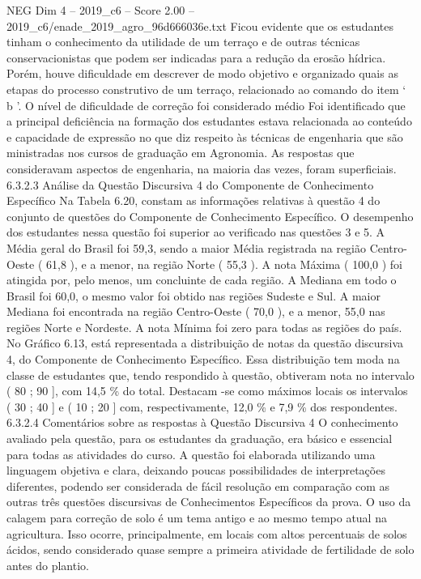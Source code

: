 \begin{textsample}{NEG Dim 4 – 2019\_c6 – Score 2.00 – 2019\_c6/enade\_2019\_agro\_96d666036e.txt}
Ficou evidente que os estudantes tinham o conhecimento da utilidade de um terraço e de outras técnicas conservacionistas que podem ser indicadas para a redução da erosão hídrica.
Porém, houve dificuldade em descrever de modo objetivo e organizado quais as etapas do processo construtivo de um terraço, relacionado ao comando do item ‘ b ’.
O nível de dificuldade de correção foi considerado médio Foi identificado que a principal deficiência na formação dos estudantes estava relacionada ao conteúdo e capacidade de expressão no que diz respeito às técnicas de engenharia que são ministradas nos cursos de graduação em Agronomia.
As respostas que consideravam aspectos de engenharia, na maioria das vezes, foram superficiais. 6.3.2.3 Análise da Questão Discursiva 4 do Componente de Conhecimento Específico Na Tabela 6.20, constam as informações relativas à questão 4 do conjunto de questões do Componente de Conhecimento Específico.
O desempenho dos estudantes nessa questão foi superior ao verificado nas questões 3 e 5.
A Média geral do Brasil foi 59,3, sendo a maior Média registrada na região Centro-Oeste ( 61,8 ), e a menor, na região Norte ( 55,3 ).
A nota Máxima ( 100,0 ) foi atingida por, pelo menos, um concluinte de cada região.
A Mediana em todo o Brasil foi 60,0, o mesmo valor foi obtido nas regiões Sudeste e Sul.
A maior Mediana foi encontrada na região Centro-Oeste ( 70,0 ), e a menor, 55,0 nas regiões Norte e Nordeste.
A nota Mínima foi zero para todas as regiões do país.
No Gráfico 6.13, está representada a distribuição de notas da questão discursiva 4, do Componente de Conhecimento Específico.
Essa distribuição tem moda na classe de estudantes que, tendo respondido à questão, obtiveram nota no intervalo ( 80 ; 90 ], com 14,5 \% do total.
Destacam -se como máximos locais os intervalos ( 30 ; 40 ] e ( 10 ; 20 ] com, respectivamente, 12,0 \% e 7,9 \% dos respondentes. 6.3.2.4 Comentários sobre as respostas à Questão Discursiva 4 O conhecimento avaliado pela questão, para os estudantes da graduação, era básico e essencial para todas as atividades do curso.
A questão foi elaborada utilizando uma linguagem objetiva e clara, deixando poucas possibilidades de interpretações diferentes, podendo ser considerada de fácil resolução em comparação com as outras três questões discursivas de Conhecimentos Específicos da prova.
O uso da calagem para correção de solo é um tema antigo e ao mesmo tempo atual na agricultura.
Isso ocorre, principalmente, em locais com altos percentuais de solos ácidos, sendo considerado quase sempre a primeira atividade de fertilidade de solo antes do plantio.

\end{textsample}
